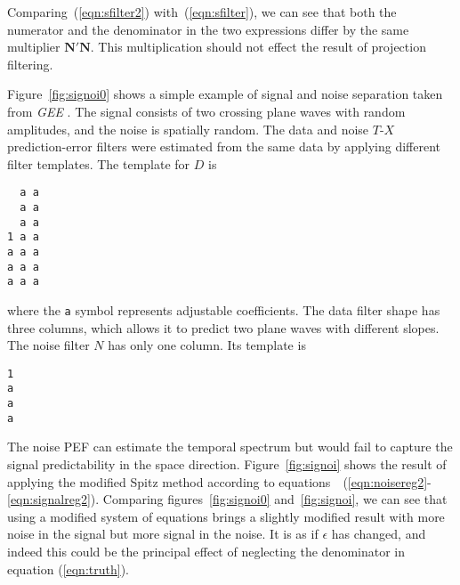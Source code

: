 Comparing~(\ref{eqn:sfilter2}) with~(\ref{eqn:sfilter}), we can see
that both the numerator and the denominator in the two expressions
differ by the same multiplier $\mathbf{N' N}$. This multiplication
should not effect the result of projection filtering.
\par
Figure~\ref{fig:signoi0} shows a simple example of signal and noise
separation taken from \emph{GEE} \cite[]{gee}. The signal consists of
two crossing plane waves with random amplitudes, and the noise is
spatially random. The data and noise $T$-$X$ prediction-error filters
were estimated from the same data by applying different filter
templates. The template for $D$ is
\begin{verbatim}
  a a
  a a
  a a
1 a a
a a a
a a a
a a a
\end{verbatim}
where the \texttt{a} symbol represents adjustable coefficients.  The
data filter shape has three columns, which allows it to predict two
plane waves with different slopes.  The noise filter $N$ has
only one column. Its template is
\begin{verbatim}
1
a
a
a
\end{verbatim}
The noise PEF can estimate the temporal spectrum but would fail to
capture the signal predictability in the space direction.
Figure~\ref{fig:signoi} shows the result of applying the modified
Spitz method according to
equations~~(\ref{eqn:noisereg2}-\ref{eqn:signalreg2}).
Comparing
figures~\ref{fig:signoi0} and~\ref{fig:signoi},
we can see that using
a modified system of equations brings
a slightly modified result with more noise in the signal
but more signal in the noise.
It is as if $\epsilon$ has changed,
and indeed this could be the principal effect
of neglecting the denominator in equation (\ref{eqn:truth}).




